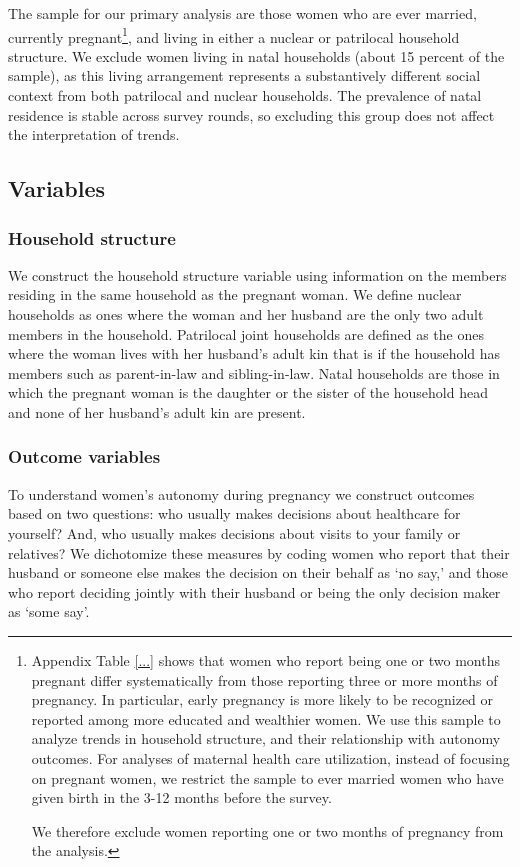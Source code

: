 \documentclass[12pt]{article}
\begin{document}
The sample for our primary analysis are those women who are ever married, currently pregnant\footnote{Appendix Table \ref{...} shows that women who report being one or two months pregnant differ systematically from those reporting three or more months of pregnancy. In particular, early pregnancy is more likely to be recognized or reported among more educated and wealthier women. We use this sample to analyze trends in household structure, and their relationship with autonomy outcomes. For analyses of maternal health care utilization, instead of focusing on pregnant women, we restrict the sample to ever married women who have given birth in the 3-12 months before the survey. 

We therefore exclude women reporting one or two months of pregnancy from the analysis.}, and living in either a nuclear or patrilocal household structure. We exclude women living in natal households (about 15 percent of the sample), as this living arrangement represents a substantively different social context from both patrilocal and nuclear households. The prevalence of natal residence is stable across survey rounds, so excluding this group does not affect the interpretation of trends. 

\subsection{Variables}

\subsubsection{Household structure}
We construct the household structure variable using information on the members residing in the same household as the pregnant woman. We define nuclear households as ones where the woman and her husband are the only two adult members in the household. Patrilocal joint households are defined as the ones where the woman lives with her husband’s adult kin that is if the household has members such as parent-in-law and sibling-in-law. Natal households are those in which the pregnant woman is the daughter or the sister of the household head and none of her husband’s adult kin are present. 

\subsubsection{Outcome variables} \label{sec:outcomes}
To understand women's autonomy during pregnancy we construct outcomes based on two questions: who usually makes decisions about healthcare for yourself?  And, who usually makes decisions about visits to your family or relatives? We dichotomize these measures by coding women who report that their husband or someone else makes the decision on their behalf as ‘no say,’ and those who report deciding jointly with their husband or being the only decision maker as ‘some say’. 
\end{document}
